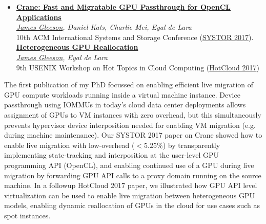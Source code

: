 \documentclass[letterpaper,11pt]{article}
\begin{document}
\begin{itemize}[leftmargin=*]
\item 
    \noindent
    \textbf{\href{https://dl.acm.org/doi/10.1145/3078468.3078478}{Crane: Fast and Migratable GPU Passthrough for OpenCL Applications}} \\
    \noindent
    \textit{\underline{James Gleeson}, Daniel Kats, Charlie Mei, Eyal de Lara} \\
    \noindent
    10th ACM International Systems and Storage Conference (\href{https://www.systor.org/2017/}{SYSTOR 2017}).
    \\
    \textbf{\href{https://www.usenix.org/conference/hotcloud17/program/presentation/gleeson}{Heterogeneous GPU Reallocation}} \\
    \noindent
    \textit{\underline{James Gleeson}, Eyal de Lara} \\
    \noindent
    9th USENIX Workshop on Hot Topics in Cloud Computing (\href{https://www.usenix.org/conference/hotcloud17}{HotCloud 2017})
\end{itemize}
\vspace{-1em}
%
The first publication of my PhD focussed on enabling efficient live migration of GPU compute workloads running 
inside a virtual machine instance.  Device passthrough using IOMMUs in today's cloud data center deployments 
allows assignment of GPUs to VM instances with zero overhead, but this simultaneously prevents hypervisor 
device interposition needed for enabling VM migration (e.g. during machine maintenance).  Our SYSTOR 2017 
paper on Crane showed how to enable live migration with low-overhead ($< 5.25\%$) by transparently 
implementing state-tracking and interposition at the user-level GPU programming API (OpenCL), and enabling 
continued use of a GPU during live migration by forwarding GPU API calls to a proxy domain running on the 
source machine.  In a followup HotCloud 2017 paper, we illustrated how GPU API level virtualization can be 
used to enable live migration between heterogeneous GPU models, enabling dynamic reallocation of GPUs in 
the cloud for use cases such as spot instances.
\end{document}
